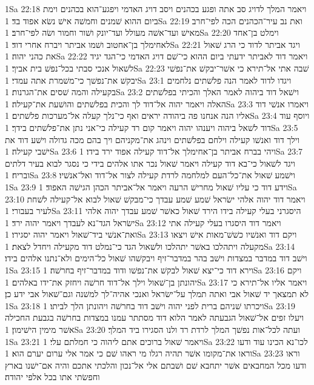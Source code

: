 1Sa 22:18  ויאמר המלך לדויג סב אתה ופגע בכהנים ויסב דויג האדמי ויפגע־הוא בכהנים וימת ביום ההוא שׁמנים וחמשׁה אישׁ נשׂא אפוד בד׃
1Sa 22:19  ואת נב עיר־הכהנים הכה לפי־חרב מאישׁ ועד־אשׁה מעולל ועד־יונק ושׁור וחמור ושׂה לפי־חרב׃
1Sa 22:20  וימלט בן־אחד לאחימלך בן־אחטוב ושׁמו אביתר ויברח אחרי דוד׃
1Sa 22:21  ויגד אביתר לדוד כי הרג שׁאול את כהני יהוה׃
1Sa 22:22  ויאמר דוד לאביתר ידעתי ביום ההוא כי־שׁם דויג האדמי כי־הגד יגיד לשׁאול אנכי סבתי בכל־נפשׁ בית אביך׃
1Sa 22:23  שׁבה אתי אל־תירא כי אשׁר־יבקשׁ את־נפשׁי יבקשׁ את־נפשׁך כי־משׁמרת אתה עמדי׃
1Sa 23:1  ויגדו לדוד לאמר הנה פלשׁתים נלחמים בקעילה והמה שׁסים את־הגרנות׃
1Sa 23:2  וישׁאל דוד ביהוה לאמר האלך והכיתי בפלשׁתים האלה ויאמר יהוה אל־דוד לך והכית בפלשׁתים והושׁעת את־קעילה׃
1Sa 23:3  ויאמרו אנשׁי דוד אליו הנה אנחנו פה ביהודה יראים ואף כי־נלך קעלה אל־מערכות פלשׁתים׃
1Sa 23:4  ויוסף עוד דוד לשׁאל ביהוה ויענהו יהוה ויאמר קום רד קעילה כי־אני נתן את־פלשׁתים בידך׃
1Sa 23:5  וילך דוד ואנשׁו קעילה וילחם בפלשׁתים וינהג את־מקניהם ויך בהם מכה גדולה וישׁע דוד את ישׁבי קעילה׃
1Sa 23:6  ויהי בברח אביתר בן־אחימלך אל־דוד קעילה אפוד ירד בידו׃
1Sa 23:7  ויגד לשׁאול כי־בא דוד קעילה ויאמר שׁאול נכר אתו אלהים בידי כי נסגר לבוא בעיר דלתים ובריח׃
1Sa 23:8  וישׁמע שׁאול את־כל־העם למלחמה לרדת קעילה לצור אל־דוד ואל־אנשׁיו׃
1Sa 23:9  וידע דוד כי עליו שׁאול מחרישׁ הרעה ויאמר אל־אביתר הכהן הגישׁה האפוד׃
1Sa 23:10  ויאמר דוד יהוה אלהי ישׂראל שׁמע שׁמע עבדך כי־מבקשׁ שׁאול לבוא אל־קעילה לשׁחת לעיר בעבורי׃
1Sa 23:11  היסגרני בעלי קעילה בידו הירד שׁאול כאשׁר שׁמע עבדך יהוה אלהי ישׂראל הגד־נא לעבדך ויאמר יהוה ירד׃
1Sa 23:12  ויאמר דוד היסגרו בעלי קעילה אתי ואת־אנשׁי ביד־שׁאול ויאמר יהוה יסגירו׃
1Sa 23:13  ויקם דוד ואנשׁיו כשׁשׁ־מאות אישׁ ויצאו מקעלה ויתהלכו באשׁר יתהלכו ולשׁאול הגד כי־נמלט דוד מקעילה ויחדל לצאת׃
1Sa 23:14  וישׁב דוד במדבר במצדות וישׁב בהר במדבר־זיף ויבקשׁהו שׁאול כל־הימים ולא־נתנו אלהים בידו׃
1Sa 23:15  וירא דוד כי־יצא שׁאול לבקשׁ את־נפשׁו ודוד במדבר־זיף בחרשׁה׃
1Sa 23:16  ויקם יהונתן בן־שׁאול וילך אל־דוד חרשׁה ויחזק את־ידו באלהים׃
1Sa 23:17  ויאמר אליו אל־תירא כי לא תמצאך יד שׁאול אבי ואתה תמלך על־ישׂראל ואנכי אהיה־לך למשׁנה וגם־שׁאול אבי ידע כן׃
1Sa 23:18  ויכרתו שׁניהם ברית לפני יהוה וישׁב דוד בחרשׁה ויהונתן הלך לביתו׃
1Sa 23:19  ויעלו זפים אל־שׁאול הגבעתה לאמר הלוא דוד מסתתר עמנו במצדות בחרשׁה בגבעת החכילה אשׁר מימין הישׁימון׃
1Sa 23:20  ועתה לכל־אות נפשׁך המלך לרדת רד ולנו הסגירו ביד המלך׃
1Sa 23:21  ויאמר שׁאול ברוכים אתם ליהוה כי חמלתם עלי׃
1Sa 23:22  לכו־נא הכינו עוד ודעו וראו את־מקומו אשׁר תהיה רגלו מי ראהו שׁם כי אמר אלי ערום יערם הוא׃
1Sa 23:23  וראו ודעו מכל המחבאים אשׁר יתחבא שׁם ושׁבתם אלי אל־נכון והלכתי אתכם והיה אם־ישׁנו בארץ וחפשׂתי אתו בכל אלפי יהודה׃
